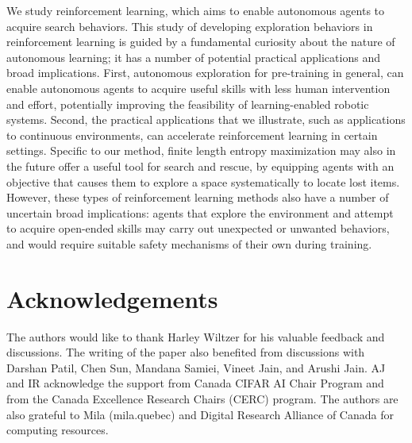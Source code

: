 \documentclass{article}
\theoremstyle{plain}
\theoremstyle{definition}
\theoremstyle{remark}
\begin{document}
We study reinforcement learning, which aims to enable autonomous agents to acquire search behaviors. 
This study of developing exploration behaviors in reinforcement learning is guided by a fundamental curiosity about the nature of autonomous learning; it has a number of potential practical applications and broad implications. 
First, autonomous exploration for pre-training in general, can enable autonomous agents to acquire useful skills with less human intervention and effort, potentially improving the feasibility of learning-enabled robotic systems. 
Second, the practical applications that we illustrate, such as applications to continuous environments, can accelerate reinforcement learning in certain settings. 
Specific to our method, finite length entropy maximization may also in the future offer a useful tool for search and rescue, by equipping agents with an objective that causes them to explore a space systematically to locate lost items. 
However, these types of reinforcement learning methods also have a number of uncertain broad implications: agents that explore the environment and attempt to acquire open-ended skills may carry out unexpected or unwanted behaviors, and would require suitable safety mechanisms of their own during training.

\section*{Acknowledgements}
The authors would like to thank Harley Wiltzer for his valuable feedback and discussions. The writing of the paper also benefited from discussions with Darshan Patil, Chen Sun, Mandana Samiei, Vineet Jain, and Arushi Jain. AJ and IR acknowledge the support from Canada CIFAR AI Chair Program and from the Canada Excellence Research Chairs (CERC) program. The authors are also grateful to Mila (mila.quebec) and Digital Research Alliance of Canada for computing resources.


\end{document}

